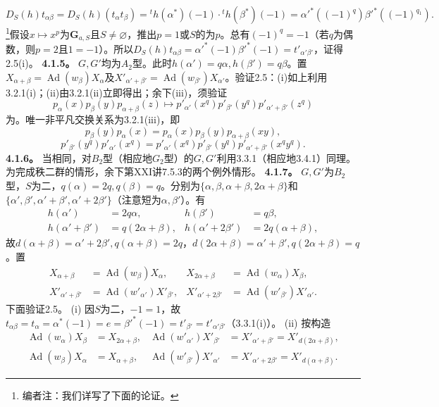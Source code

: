 \[D_S(h)t_{\alpha\beta}=D_S(h)(t_\alpha t_\beta)={}^th(\alpha^*)(-1)\cdot{}^th(\beta^*)(-1)=\alpha'^*((-1)^q)\beta'^*((-1)^{q_1}).\]
\footnote{编者注：我们详写了下面的论证。}假设$x\mapsto x^p$为$\mathbf G_{a,S}$且$S\ne\varnothing$，推出$p=1$或$S$的为$p$。总有$(-1)^q=-1$（若$q$为偶数，则$p=2$且$1=-1$）。所以$D_S(h)t_{\alpha\beta}=\alpha'^*(-1)\beta'^*(-1)=t'_{\alpha'\beta'}$，证得2.5(i)。
\textbf{4.1.5。} $G,G'$均为$A_2$型。此时$h(\alpha')=q\alpha,h(\beta')=q\beta$。置$X_{\alpha+\beta}=\operatorname{Ad}(w_\beta)X_\alpha$及$X'_{\alpha'+\beta'}=\operatorname{Ad}(w_{\beta'})X_{\alpha'}$。验证2.5：(i)如上利用3.2.1(i)；(ii)由3.2.1(ii)立即得出；余下(iii)，须验证
\[p_\alpha(x)p_\beta(y)p_{\alpha+\beta}(z)\longmapsto p'_{\alpha'}(x^q)p'_{\beta'}(y^q)p'_{\alpha'+\beta'}(z^q)\]
为。唯一非平凡交换关系为3.2.1(iii)，即
\[p_\beta(y)p_\alpha(x)=p_\alpha(x)p_\beta(y)p_{\alpha+\beta}(xy),\]
\[p'_{\beta'}(y^q)p'_{\alpha'}(x^q)=p'_{\alpha'}(x^q)p'_{\beta'}(y^q)p'_{\alpha'+\beta'}(x^qy^q).\]
\textbf{4.1.6。} 当相同，对$B_2$型（相应地$G_2$型）的$G,G'$利用3.3.1（相应地3.4.1）同理。为完成秩二群的情形，余下第XXI讲7.5.3的两个例外情形。
\textbf{4.1.7。} $G,G'$为$B_2$型，$S$为二，$q(\alpha)=2q,q(\beta)=q$。分别为$\{\alpha,\beta,\alpha+\beta,2\alpha+\beta\}$和$\{\alpha',\beta',\alpha'+\beta',\alpha'+2\beta'\}$（注意短为$\alpha,\beta'$）。有
\[\begin{aligned}h(\alpha')&=2q\alpha,&h(\beta')&=q\beta,\\h(\alpha'+\beta')&=q(2\alpha+\beta),&h(\alpha'+2\beta')&=2q(\alpha+\beta),\end{aligned}\]
故$d(\alpha+\beta)=\alpha'+2\beta',q(\alpha+\beta)=2q$，$d(2\alpha+\beta)=\alpha'+\beta',q(2\alpha+\beta)=q$。置
\[\begin{aligned}X_{\alpha+\beta}&=\operatorname{Ad}(w_\beta)X_\alpha,&X_{2\alpha+\beta}&=\operatorname{Ad}(w_\alpha)X_\beta,\\X'_{\alpha'+\beta'}&=\operatorname{Ad}(w'_{\alpha'})X'_{\beta'},&X'_{\alpha'+2\beta'}&=\operatorname{Ad}(w'_{\beta'})X'_{\alpha'}.\end{aligned}\]
下面验证2.5。
(i) 因$S$为二，$-1=1$，故$t_{\alpha\beta}=t_\alpha=\alpha^*(-1)=e=\beta'^*(-1)=t'_{\beta'}=t'_{\alpha'\beta'}$（3.3.1(i)）。
(ii) 按构造
\[\begin{aligned}\operatorname{Ad}(w_\alpha)X_\beta&=X_{2\alpha+\beta},&\operatorname{Ad}(w'_{\alpha'})X'_{\beta'}&=X'_{\alpha'+\beta'}=X'_{d(2\alpha+\beta)},\\\operatorname{Ad}(w_\beta)X_\alpha&=X_{\alpha+\beta},&\operatorname{Ad}(w'_{\beta'})X'_{\alpha'}&=X'_{\alpha'+2\beta'}=X'_{d(\alpha+\beta)}.\end{aligned}\]
